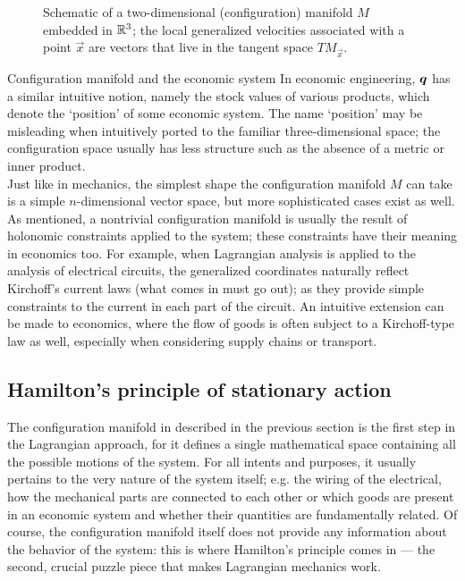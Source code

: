 \begin{figure}[ht]
    \centering
    
    \caption{Schematic of a two-dimensional (configuration) manifold $M$ embedded in $\mathbb{R}^3$; the local generalized velocities associated with a point $\vec{x}$ are vectors that live in the tangent space $TM_{\vec{x}}$.}
    \label{fig:conf_mnfold}
\end{figure}

\begin{econ}{Configuration manifold and the economic system}
    In economic engineering, \(\vb*{q}\) has a similar intuitive notion, namely the stock values of various products, which denote the `position' of some economic system. The name `position' may be misleading when intuitively ported to the familiar three-dimensional space; the configuration space usually has less structure such as the absence of a metric or inner product.\\

    Just like in mechanics, the simplest shape the configuration manifold $M$ can take is a simple $n$-dimensional vector space, but more sophisticated cases exist as well. As mentioned, a nontrivial configuration manifold is usually the result of holonomic constraints applied to the system; these constraints have their meaning in economics too.
    For example, when Lagrangian analysis is applied to the analysis of electrical circuits, the generalized coordinates naturally reflect Kirchoff's current laws (what comes in must go out); as they provide simple constraints to the current in each part of the circuit. An intuitive extension can be made to economics, where the flow of goods is often subject to a Kirchoff-type law as well, especially when considering supply chains or transport. 
\end{econ}

\subsection{Hamilton's principle of stationary action}
The configuration manifold in described in the previous section is the first step in the Lagrangian approach, for it defines a single mathematical space containing all the possible motions of the system. For all intents and purposes, it usually pertains to the very nature of the system itself; e.g. the wiring of the electrical, how the mechanical parts are connected to each other or which goods are present in an economic system and whether their quantities are fundamentally related. Of course, the configuration manifold itself does not provide any information about the behavior of the system: this is where Hamilton's principle comes in --- the second, crucial puzzle piece that makes Lagrangian mechanics work.

